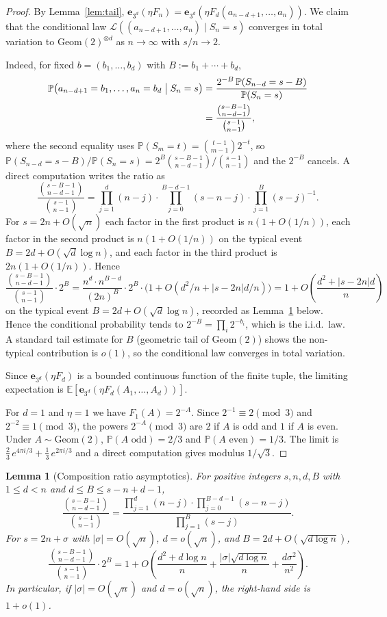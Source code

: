 \documentclass[11pt,a4paper]{amsart}
\theoremstyle{plain}
\newtheorem{lemma}[theorem]{Lemma}
\theoremstyle{definition}
\newcommand{\E}{\mathbb{E}}
\newcommand{\PP}{\mathbb{P}}
\newcommand{\Geom}{\mathrm{Geom}}
\begin{document}
\begin{proof}
By Lemma~\ref{lem:tail}, $\mathbf e_{3^d}(\eta F_n)
=\mathbf e_{3^d}(\eta F_d(a_{n-d+1},\dots,a_n))$.
We claim that the conditional law
$\mathcal L((a_{n-d+1},\dots,a_n)\mid S_n=s)$
converges in total variation to $\Geom(2)^{\otimes d}$ as $n\to\infty$
with $s/n\to2$.

Indeed, for fixed $b=(b_1,\dots,b_d)$ with $B:=b_1+\cdots+b_d$,
\begin{align*}
\PP\bigl(a_{n-d+1}=b_1,\dots,a_n=b_d\bigm| S_n=s\bigr)
&=\frac{2^{-B}\,\PP(S_{n-d}=s-B)}{\PP(S_n=s)}\\
&=\frac{\binom{s-B-1}{n-d-1}}{\binom{s-1}{n-1}},
\end{align*}
where the second equality uses $\PP(S_m=t)=\binom{t-1}{m-1}2^{-t}$, so
$\PP(S_{n-d}=s-B)/\PP(S_n=s)=2^B\binom{s-B-1}{n-d-1}/\binom{s-1}{n-1}$
and the $2^{-B}$ cancels.
A direct computation writes the ratio as
$$
\frac{\binom{s-B-1}{n-d-1}}{\binom{s-1}{n-1}}
=\prod_{j=1}^d(n-j)\cdot
\prod_{j=0}^{B-d-1}(s-n-j)\cdot
\prod_{j=1}^{B}(s-j)^{-1}.
$$
For $s=2n+O(\sqrt n)$ each factor in the first product is $n(1+O(1/n))$,
each factor in the second product is $n(1+O(1/n))$ on the typical event
$B=2d+O(\sqrt d\log n)$, and each factor in the third product is
$2n(1+O(1/n))$.
Hence
$$
\frac{\binom{s-B-1}{n-d-1}}{\binom{s-1}{n-1}}\cdot 2^{B}
=\frac{n^d\cdot n^{B-d}}{(2n)^B}\cdot 2^B\cdot\bigl(1+O(d^2/n+|s-2n|d/n)\bigr)
=1+O\!\left(\frac{d^2+|s-2n|d}{n}\right)
$$
on the typical event $B=2d+O(\sqrt d\log n)$, recorded as
Lemma~\ref{lem:ratio} below.
Hence the conditional probability tends to $2^{-B}=\prod_i 2^{-b_i}$,
which is the i.i.d.\ law.
A standard tail estimate for $B$ (geometric tail of $\Geom(2)$) shows the
non-typical contribution is $o(1)$, so the conditional law converges in
total variation.

Since $\mathbf e_{3^d}(\eta F_d)$ is a bounded continuous function of the
finite tuple, the limiting expectation is
$\E[\mathbf e_{3^d}(\eta F_d(A_1,\dots,A_d))]$.

For $d=1$ and $\eta=1$ we have $F_1(A)=2^{-A}$.
Since $2^{-1}\equiv 2\pmod 3$ and $2^{-2}\equiv 1\pmod 3$, the powers
$2^{-A}\pmod 3$ are $2$ if $A$ is odd and $1$ if $A$ is even.
Under $A\sim\Geom(2)$, $\PP(A\text{ odd})=2/3$ and $\PP(A\text{ even})=1/3$.
The limit is $\tfrac23\,e^{4\pi i/3}+\tfrac13\,e^{2\pi i/3}$ and a direct
computation gives modulus $1/\sqrt 3$.
\end{proof}

\begin{lemma}[Composition ratio asymptotics]\label{lem:ratio}
For positive integers $s,n,d,B$ with $1\le d<n$ and $d\le B\le s-n+d-1$,
$$
\frac{\binom{s-B-1}{n-d-1}}{\binom{s-1}{n-1}}
=\frac{\prod_{j=1}^d(n-j)\cdot\prod_{j=0}^{B-d-1}(s-n-j)}
{\prod_{j=1}^{B}(s-j)}.
$$
For $s=2n+\sigma$ with $|\sigma|=O(\sqrt n)$, $d=o(\sqrt n)$, and
$B=2d+O(\sqrt{d\log n})$,
$$
\frac{\binom{s-B-1}{n-d-1}}{\binom{s-1}{n-1}}\cdot 2^B
=1+O\!\left(\frac{d^2+d\log n}{n}+\frac{|\sigma|\sqrt{d\log n}}{n}
+\frac{d\sigma^2}{n^2}\right).
$$
In particular, if $|\sigma|=O(\sqrt n)$ and $d=o(\sqrt n)$, the
right-hand side is $1+o(1)$.
\end{lemma}
\end{document}
